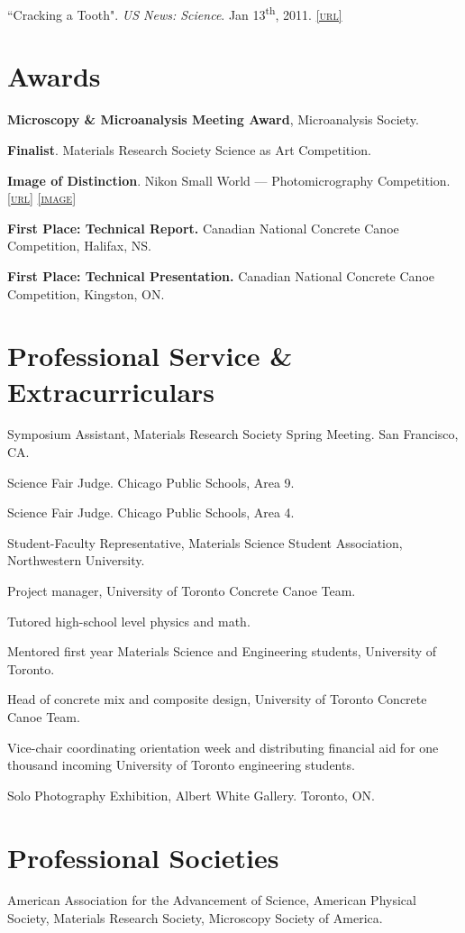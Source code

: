  ``Cracking a Tooth". \emph{US News: Science}. Jan 13\textsuperscript{th}, 2011. \href{http://www.usnews.com/science/articles/2011/01/13/cracking-a-tooth}{\textsc{\footnotesize{[url]}}}
\endgroup

\section*{Awards}
\textbf{Microscopy \& Microanalysis Meeting Award}, Microanalysis Society.

\begingroup\setlength{\parskip}{0.1cm}
\textbf{Finalist}. Materials Research Society Science as Art Competition.

\textbf{Image of Distinction}. Nikon Small World --- Photomicrography Competition. \href{http://www.nikonsmallworld.com/detail/year/2009/66}{\textsc{\footnotesize{[url]}}} \href{http://lylegordon.ca/nikon2009.jpg}{\textsc{\footnotesize{[image]}}}

\textbf{First Place: Technical Report.} Canadian National Concrete Canoe Competition, Halifax, NS.

\textbf{First Place: Technical Presentation.} Canadian National Concrete Canoe Competition, Kingston, ON.
\endgroup

\section*{Professional Service \& Extracurriculars}
Symposium Assistant, Materials Research Society Spring Meeting. San Francisco, CA.

\begingroup\setlength{\parskip}{0.1cm}
Science Fair Judge. Chicago Public Schools, Area 9.

Science Fair Judge. Chicago Public Schools, Area 4.

Student-Faculty Representative, Materials Science Student Association, Northwestern University.

Project manager, University of Toronto Concrete Canoe Team.

Tutored high-school level physics and math.

Mentored first year Materials Science and Engineering students, University of Toronto.

Head of concrete mix and composite design, University of Toronto Concrete Canoe Team.

Vice-chair coordinating orientation week and distributing financial aid for one thousand incoming University of Toronto engineering students.

Solo Photography Exhibition, Albert White Gallery. Toronto, ON.
\endgroup

\section*{Professional Societies}
American Association for the Advancement of Science, American Physical Society, Materials Research Society, Microscopy Society of America.